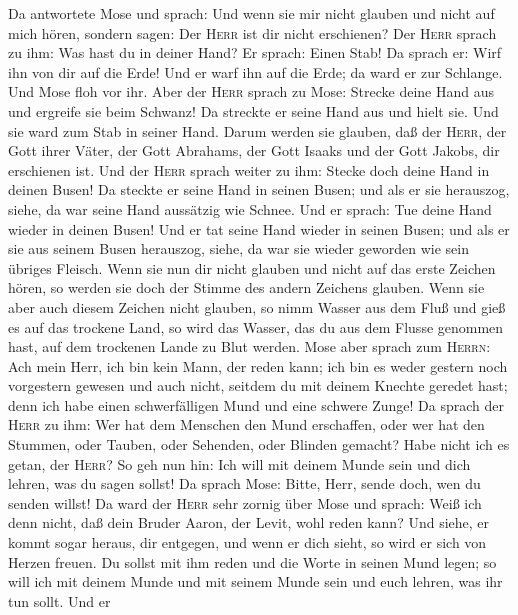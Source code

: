  Da antwortete Mose und sprach: Und wenn sie mir nicht
glauben und nicht auf mich hören, sondern sagen: Der \textsc{Herr} ist
dir nicht erschienen?  Der \textsc{Herr} sprach zu ihm:
Was hast du in deiner Hand? Er sprach: Einen Stab!  Da
sprach er: Wirf ihn von dir auf die Erde! Und er warf ihn auf die Erde;
da ward er zur Schlange. Und Mose floh vor ihr.  Aber der
\textsc{Herr} sprach zu Mose: Strecke deine Hand aus und ergreife sie
beim Schwanz! Da streckte er seine Hand aus und hielt sie. Und sie ward
zum Stab in seiner Hand.  Darum werden sie glauben, daß
der \textsc{Herr}, der Gott ihrer Väter, der Gott Abrahams, der Gott
Isaaks und der Gott Jakobs, dir erschienen ist.  Und der
\textsc{Herr} sprach weiter zu ihm: Stecke doch deine Hand in deinen
Busen! Da steckte er seine Hand in seinen Busen; und als er sie
herauszog, siehe, da war seine Hand aussätzig wie Schnee. 
Und er sprach: Tue deine Hand wieder in deinen Busen! Und er tat seine
Hand wieder in seinen Busen; und als er sie aus seinem Busen herauszog,
siehe, da war sie wieder geworden wie sein übriges Fleisch.
 Wenn sie nun dir nicht glauben und nicht auf das erste
Zeichen hören, so werden sie doch der Stimme des andern Zeichens
glauben.  Wenn sie aber auch diesem Zeichen nicht glauben,
so nimm Wasser aus dem Fluß und gieß es auf das trockene Land, so wird
das Wasser, das du aus dem Flusse genommen hast, auf dem trockenen Lande
zu Blut werden.  Mose aber sprach zum \textsc{Herrn}: Ach
mein Herr, ich bin kein Mann, der reden kann; ich bin es weder gestern
noch vorgestern gewesen und auch nicht, seitdem du mit deinem Knechte
geredet hast; denn ich habe einen schwerfälligen Mund und eine schwere
Zunge!  Da sprach der \textsc{Herr} zu ihm: Wer hat dem
Menschen den Mund erschaffen, oder wer hat den Stummen, oder Tauben,
oder Sehenden, oder Blinden gemacht? Habe nicht ich es getan, der
\textsc{Herr}?  So geh nun hin: Ich will mit deinem Munde
sein und dich lehren, was du sagen sollst!  Da sprach
Mose: Bitte, Herr, sende doch, wen du senden willst!  Da
ward der \textsc{Herr} sehr zornig über Mose und sprach: Weiß ich denn
nicht, daß dein Bruder Aaron, der Levit, wohl reden kann? Und siehe, er
kommt sogar heraus, dir entgegen, und wenn er dich sieht, so wird er
sich von Herzen freuen.  Du sollst mit ihm reden und die
Worte in seinen Mund legen; so will ich mit deinem Munde und mit seinem
Munde sein und euch lehren, was ihr tun sollt.  Und er
